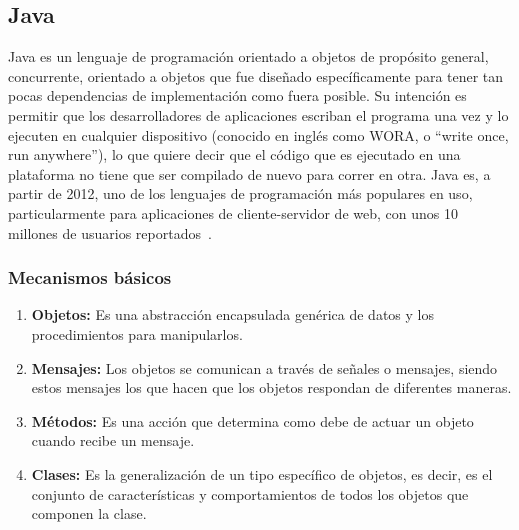 \subsection{Java}
Java es un lenguaje de programación orientado a objetos de propósito
 general, concurrente,  orientado a objetos que fue diseñado
 específicamente para tener tan pocas dependencias de implementación
 como fuera posible. Su intención es permitir que los desarrolladores
 de aplicaciones escriban el programa una vez y lo ejecuten en 
cualquier dispositivo (conocido en inglés como WORA, o 
``write once, run anywhere''), lo que quiere decir que el código
 que es ejecutado en una plataforma no tiene que ser compilado de
 nuevo para correr en otra. Java es, a partir de 2012, uno de los
 lenguajes de programación más populares en uso, particularmente
 para aplicaciones de cliente-servidor de web, con unos 10 millones
 de usuarios reportados~\cite{JAVA}.
\subsubsection{Mecanismos básicos}
\begin{enumerate}
\item \textbf{Objetos:}
 Es una abstracción encapsulada genérica de datos y los procedimientos
 para manipularlos.
\item \textbf{Mensajes:}
Los objetos se comunican a través de señales o mensajes, siendo estos
 mensajes los que hacen que los objetos respondan de diferentes maneras.
\item \textbf{Métodos:}
Es una acción que determina como debe de actuar un objeto cuando 
recibe un mensaje.
\item \textbf{Clases:}
Es la generalización de un tipo específico de objetos, es decir, es el 
conjunto de características y comportamientos de todos los objetos 
que componen la clase.
\end{enumerate}
